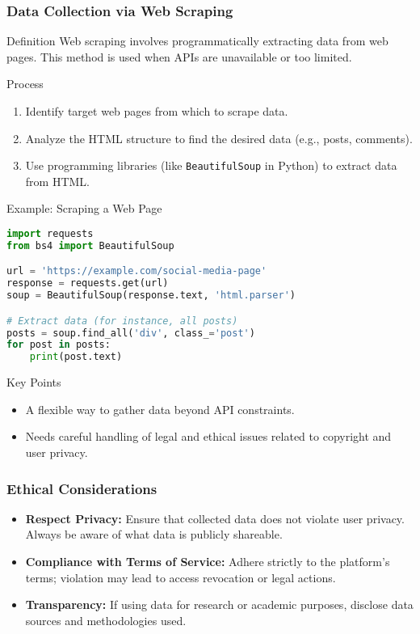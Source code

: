 \documentclass{beamer}
\begin{document}
\begin{frame}[fragile]
    \frametitle{Data Collection via Web Scraping}
    \begin{block}{Definition}
        Web scraping involves programmatically extracting data from web pages. 
        This method is used when APIs are unavailable or too limited.
    \end{block}

    \begin{block}{Process}
        \begin{enumerate}
            \item Identify target web pages from which to scrape data.
            \item Analyze the HTML structure to find the desired data (e.g., posts, comments).
            \item Use programming libraries (like \texttt{BeautifulSoup} in Python) to extract data from HTML.
        \end{enumerate}
    \end{block}

    \begin{block}{Example: Scraping a Web Page}
        \begin{lstlisting}[language=Python]
import requests
from bs4 import BeautifulSoup

url = 'https://example.com/social-media-page'
response = requests.get(url)
soup = BeautifulSoup(response.text, 'html.parser')

# Extract data (for instance, all posts)
posts = soup.find_all('div', class_='post')
for post in posts:
    print(post.text)
        \end{lstlisting}
    \end{block}

    \begin{block}{Key Points}
        \begin{itemize}
            \item A flexible way to gather data beyond API constraints.
            \item Needs careful handling of legal and ethical issues related to copyright and user privacy.
        \end{itemize}
    \end{block}
\end{frame}

\begin{frame}
    \frametitle{Ethical Considerations}
    \begin{itemize}
        \item \textbf{Respect Privacy:} Ensure that collected data does not violate user privacy. 
              Always be aware of what data is publicly shareable.
        \item \textbf{Compliance with Terms of Service:} Adhere strictly to the platform's terms; 
              violation may lead to access revocation or legal actions.
        \item \textbf{Transparency:} If using data for research or academic purposes, disclose 
              data sources and methodologies used.
    \end{itemize}
\end{frame}
\end{document}
